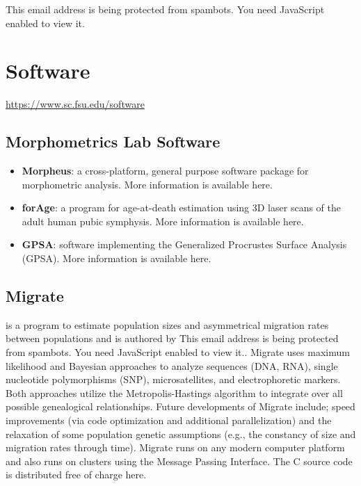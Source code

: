 \documentclass[12pt,a4paper]{article}
\begin{document}
This email address is being protected from spambots. You need JavaScript enabled to view it.

\section{Software}
\url{https://www.sc.fsu.edu/software}

\subsection{Morphometrics Lab Software}

\begin{itemize}
    \item \textbf{Morpheus}: a cross-platform, general purpose software package for morphometric analysis. More information is available here.
    
    \item \textbf{forAge}: a program for age-at-death estimation using 3D laser scans of the adult human pubic symphysis. More information is available here.

    \item \textbf{GPSA}: software implementing the Generalized Procrustes Surface Analysis (GPSA). More information is available here.
\end{itemize}

\subsection{Migrate}
is a program to estimate population sizes and asymmetrical migration rates between populations and is authored by This email address is being protected from spambots. You need JavaScript enabled to view it.. Migrate uses maximum likelihood and Bayesian approaches to analyze sequences (DNA, RNA), single nucleotide polymorphisms (SNP), microsatellites, and electrophoretic markers. Both approaches utilize the Metropolis-Hastings algorithm to integrate over all possible genealogical relationships. Future developments of Migrate include; speed improvements (via code optimization and additional parallelization) and the relaxation of some population genetic assumptions (e.g., the constancy of size and migration rates through time). Migrate runs on any modern computer platform and also runs on clusters using the Message Passing Interface. The C source code is distributed free of charge here.
\end{document}
